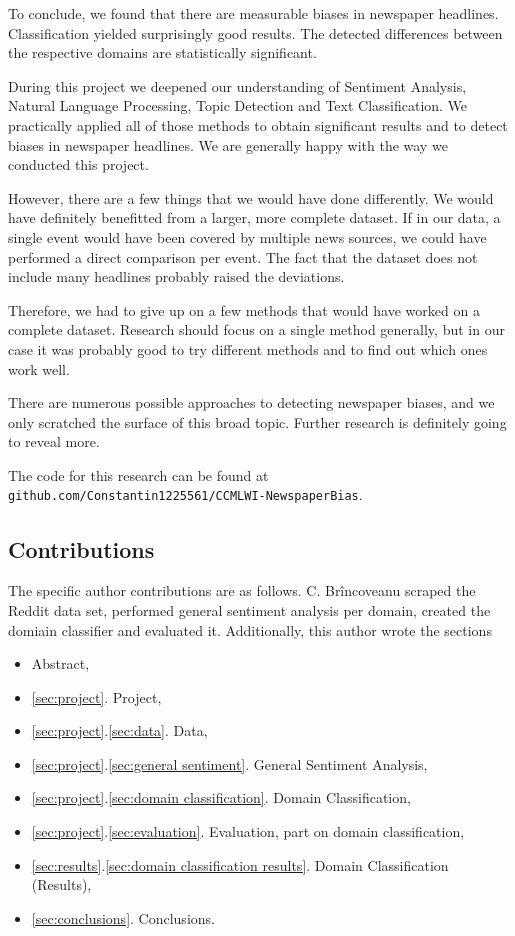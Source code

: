 \documentclass[final]{ieee}
\begin{document}
To conclude, we found that there are measurable biases in newspaper headlines. Classification yielded surprisingly good results. The detected differences between the respective domains are statistically significant.

During this project we deepened our understanding of Sentiment Analysis, Natural Language Processing, Topic Detection and Text Classification. We practically applied all of those methods to obtain significant results and to detect biases in newspaper headlines. We are generally happy with the way we conducted this project.

However, there are a few things that we would have done differently. We would have definitely benefitted from a larger, more complete dataset. If in our data, a single event would have been covered by multiple news sources, we could have performed a direct comparison per event. The fact that the dataset does not include many headlines probably raised the deviations.

Therefore, we had to give up on a few methods that would have worked on a complete dataset. Research should focus on a single method generally, but in our case it was probably good to try different methods and to find out which ones work well.

There are numerous possible approaches to detecting newspaper biases, and we only scratched the surface of this broad topic. Further research is definitely going to reveal more.

The code for this research can be found at \texttt{github.com/Constantin1225561/CCMLWI-NewspaperBias}.

\subsection{Contributions}\label{sec:contributions}

The specific author contributions are as follows. C. Br\^{i}ncoveanu scraped the Reddit data set, performed general sentiment analysis per domain, created the domiain classifier and evaluated it. Additionally, this author wrote the sections 
\begin{itemize}
\item Abstract,
\item \ref{sec:project}. Project,
\item \ref{sec:project}.\ref{sec:data}. Data,
\item \ref{sec:project}.\ref{sec:general sentiment}. General Sentiment Analysis,
\item \ref{sec:project}.\ref{sec:domain classification}. Domain Classification,
\item \ref{sec:project}.\ref{sec:evaluation}. Evaluation, part on domain classification,
\item \ref{sec:results}.\ref{sec:domain classification results}. Domain Classification (Results),
\item \ref{sec:conclusions}. Conclusions.
\end{itemize}
\end{document}
